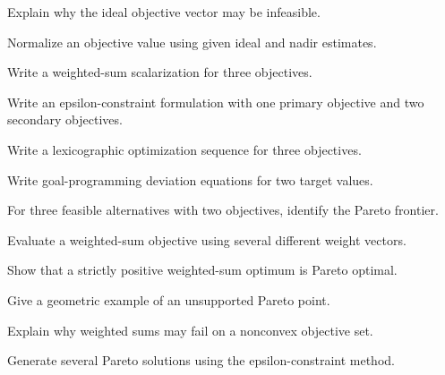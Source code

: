 \begin{exercise}[2]
Explain why the ideal objective vector may be infeasible.
\end{exercise}

\begin{exercise}[2]
Normalize an objective value using given ideal and nadir estimates.
\end{exercise}

\begin{exercise}[2]
Write a weighted-sum scalarization for three objectives.
\end{exercise}

\begin{exercise}[2]
Write an epsilon-constraint formulation with one primary objective and two
secondary objectives.
\end{exercise}

\begin{exercise}[2]
Write a lexicographic optimization sequence for three objectives.
\end{exercise}

\begin{exercise}[2]
Write goal-programming deviation equations for two target values.
\end{exercise}

\begin{exercise}[3]
For three feasible alternatives with two objectives, identify the Pareto
frontier.
\end{exercise}

\begin{exercise}[3]
Evaluate a weighted-sum objective using several different weight vectors.
\end{exercise}

\begin{exercise}[3]
Show that a strictly positive weighted-sum optimum is Pareto optimal.
\end{exercise}

\begin{exercise}[3]
Give a geometric example of an unsupported Pareto point.
\end{exercise}

\begin{exercise}[3]
Explain why weighted sums may fail on a nonconvex objective set.
\end{exercise}

\begin{exercise}[3]
Generate several Pareto solutions using the epsilon-constraint method.
\end{exercise}

